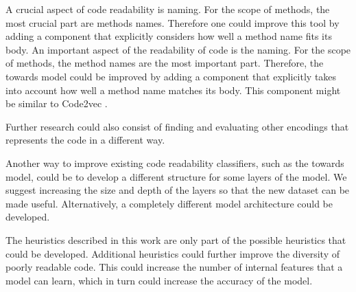 \documentclass[%
class=scrreprt,
chapterprefix=false,%
open=right,%
twoside=false,%
paper=a4,%
logofile={Logo\_zentral\_farbig\_EN.png},%
thesistype=master,%
UKenglish,%
]{se2thesis}
\theoremstyle{definition}
\begin{document}
	A crucial aspect of code readability is naming. For the scope of methods, the most crucial part are methods names. Therefore one could improve this tool by adding a component that explicitly considers how well a method name fits its body.
	An important aspect of the readability of code is the naming. For the scope of methods, the method names are the most important part. Therefore, the towards model could be improved by adding a component that explicitly takes into account how well a method name matches its body. This component might be similar to Code2vec \cite{alon2019code2vec}.
	
	Further research could also consist of finding and evaluating other encodings that represents the code in a different way.
	
	Another way to improve existing code readability classifiers, such as the towards model, could be to develop a different structure for some layers of the model. We suggest increasing the size and depth of the layers so that the new dataset can be made useful. Alternatively, a completely different model architecture could be developed. 
	
	The heuristics described in this work are only part of the possible heuristics that could be developed. Additional heuristics could further improve the diversity of poorly readable code. This could increase the number of internal features that a model can learn, which in turn could increase the accuracy of the model.

	
	\backmatter
	
	\printbibliography
	
\end{document}

